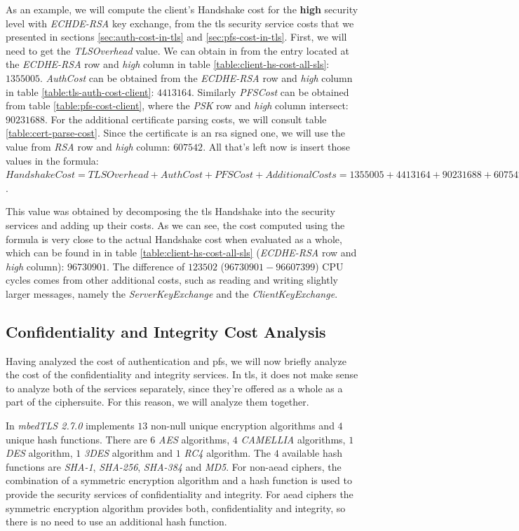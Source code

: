 \documentclass{llncs}
\begin{document}
As an example, we will compute the client's Handshake cost for the \textbf{high} security level with \textit{ECHDE-RSA}
key exchange, from the \gls{tls} security service costs that we presented in sections \ref{sec:auth-cost-in-tls} and \ref{sec:pfs-cost-in-tls}.
First, we will need to get the \textit{TLSOverhead} value. We can obtain in from the entry located at the
\textit{ECDHE-RSA} row and \textit{high} column in table \ref{table:client-hs-cost-all-sls}: $1355005$. \textit{AuthCost} can be obtained
from the \textit{ECDHE-RSA} row and \textit{high} column in table \ref{table:tls-auth-cost-client}: $4413164$. Similarly \textit{PFSCost}
can be obtained from table \ref{table:pfs-cost-client}, where the \textit{PSK} row and \textit{high} column intersect: $90231688$.
For the additional certificate parsing costs, we will consult table \ref{table:cert-parse-cost}. Since the certificate is an \gls{rsa} signed one,
we will use the value from \textit{RSA} row and \textit{high} column: $607542$. All that's left now is insert those values in the formula:
$Handshake Cost = TLS Overhead + Auth Cost + PFS Cost + Additional Costs = 1355005 + 4413164 + 90231688 + 607542 = 96607399$.

This value was obtained by decomposing the \gls{tls} Handshake into the security services and adding up their costs. As we can see,
the cost computed using the formula is very close to the actual Handshake cost when evaluated as a whole,
which can be found in in table \ref{table:client-hs-cost-all-sls} (\textit{ECDHE-RSA} row and \textit{high} column): $96730901$.
The difference of $123502$ ($96730901-96607399$) CPU cycles comes from other additional costs, such as reading and writing slightly larger
messages, namely the \textit{ServerKeyExchange} and the \textit{ClientKeyExchange}.

\subsection{Confidentiality and Integrity Cost Analysis} \label{sec:confid-costs}

Having analyzed the cost of authentication and \gls{pfs}, we will now briefly analyze the cost of the confidentiality and integrity services.
In \gls{tls}, it does not make sense to analyze both of the services separately, since they're offered as a whole as a part of the ciphersuite.
For this reason, we will analyze them together.

In \textit{mbedTLS 2.7.0} implements $13$ non-null unique encryption algorithms and $4$ unique hash functions. There are $6$ \textit{AES} 
algorithms, $4$ \textit{CAMELLIA} algorithms,
$1$ \textit{DES} algorithm, $1$ \textit{3DES} algorithm and $1$ \textit{RC4} algorithm. The $4$ available hash functions are \textit{SHA-1}, 
\textit{SHA-256}, \textit{SHA-384} and \textit{MD5}.
For non-\gls{aead} ciphers, the combination of a symmetric encryption algorithm and a hash function is used to provide the security services of confidentiality and 
integrity. For \gls{aead} ciphers the symmetric encryption algorithm provides both, confidentiality and integrity, so there is no need
to use an additional hash function.
\end{document}
